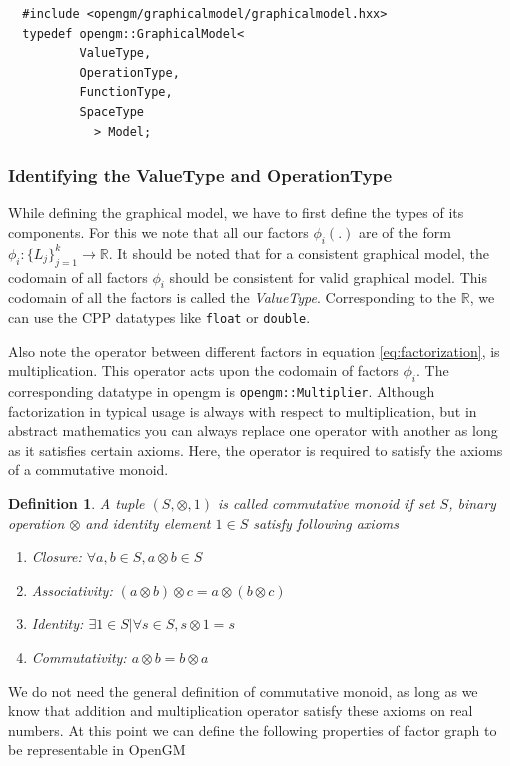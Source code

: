 \documentclass[12pt,oneside,letterpaper]{article}
\newtheorem{definition}{Definition}
\begin{document}
\begin{lstlisting}
  #include <opengm/graphicalmodel/graphicalmodel.hxx>
  typedef opengm::GraphicalModel<
          ValueType,
          OperationType,
          FunctionType,
          SpaceType
            > Model;
\end{lstlisting}

\subsubsection{Identifying the ValueType and OperationType}

While defining the graphical model, we have to first define the types of its
components. For this we note that all our factors $\phi_i(.)$ are of the form
$\phi_i : \{L_j\}_{j=1}^{k} \rightarrow \mathbb{R}$. It should be noted that
for a consistent graphical model, the codomain of all factors $\phi_i$ should
be consistent for valid graphical model. This codomain of all the factors is called
the \emph{ValueType}. Corresponding to the $\mathbb{R}$, we can use the CPP
datatypes like \lstinline|float| or \lstinline|double|.

Also note the operator between different factors in equation
\eqref{eq:factorization}, is multiplication. This operator acts upon the
codomain of factors $\phi_i$. The corresponding datatype in opengm is
\lstinline|opengm::Multiplier|.  Although factorization in typical usage is
always with respect to multiplication, but in abstract mathematics you can
always replace one operator with another as long as it satisfies certain
axioms. Here, the operator is required to satisfy the axioms of a commutative
monoid.

\begin{definition}
  A tuple $(S, \otimes, 1)$ is called commutative monoid if set $S$, binary operation $\otimes$ and identity element $1 \in S$ satisfy following axioms
  \begin{enumerate}
    \item Closure: $\forall a, b \in S, a \otimes b \in S$
    \item Associativity: $(a \otimes b) \otimes  c = a \otimes (b \otimes  c)$
    \item Identity: $\exists 1 \in S | \forall s \in S, s \otimes 1 = s$
    \item Commutativity: $a\otimes b = b\otimes a$
  \end{enumerate}
\end{definition}

We do not need the general definition of commutative monoid, as long as we know
that addition and multiplication operator satisfy these axioms on real numbers.
At this point we can define the following properties of factor graph to be
representable in OpenGM
\end{document}
